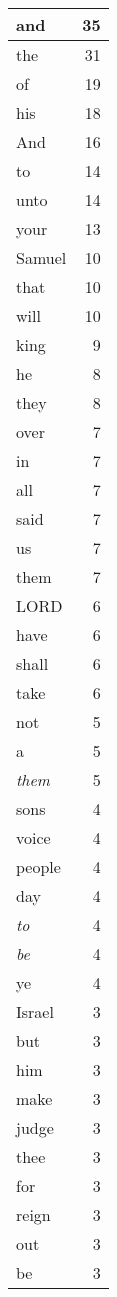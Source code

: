 \begin{center}
\begin{longtable}{l|r}
\hline \hline
\endlastfoot
and & 35 \\ \hline
the & 31 \\ \hline
of & 19 \\ \hline
his & 18 \\ \hline
And & 16 \\ \hline
to & 14 \\ \hline
unto & 14 \\ \hline
your & 13 \\ \hline
Samuel & 10 \\ \hline
that & 10 \\ \hline
will & 10 \\ \hline
king & 9 \\ \hline
he & 8 \\ \hline
they & 8 \\ \hline
over & 7 \\ \hline
in & 7 \\ \hline
all & 7 \\ \hline
said & 7 \\ \hline
us & 7 \\ \hline
them & 7 \\ \hline
LORD & 6 \\ \hline
have & 6 \\ \hline
shall & 6 \\ \hline
take & 6 \\ \hline
not & 5 \\ \hline
a & 5 \\ \hline
\emph{them} & 5 \\ \hline
sons & 4 \\ \hline
voice & 4 \\ \hline
people & 4 \\ \hline
day & 4 \\ \hline
\emph{to} & 4 \\ \hline
\emph{be} & 4 \\ \hline
ye & 4 \\ \hline
Israel & 3 \\ \hline
but & 3 \\ \hline
him & 3 \\ \hline
make & 3 \\ \hline
judge & 3 \\ \hline
thee & 3 \\ \hline
for & 3 \\ \hline
reign & 3 \\ \hline
out & 3 \\ \hline
be & 3 \\ \hline

\end{longtable}
\end{center}
